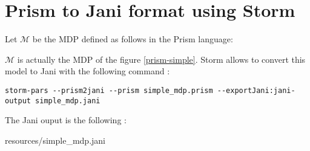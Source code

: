 \section{Prism to Jani format using Storm}\label{prism2jani}
Let $\mathcal{M}$ be the MDP defined as follows in the Prism language:

$\mathcal{M}$ is actually the MDP of the figure \ref{prism-simple}.
Storm allows to convert this model to Jani with the following command :
{\scriptsize
\begin{verbatim}
storm-pars --prism2jani --prism simple_mdp.prism --exportJani:jani-output simple_mdp.jani
\end{verbatim}
}
The Jani ouput is the following :

    {resources/simple_mdp.jani}
